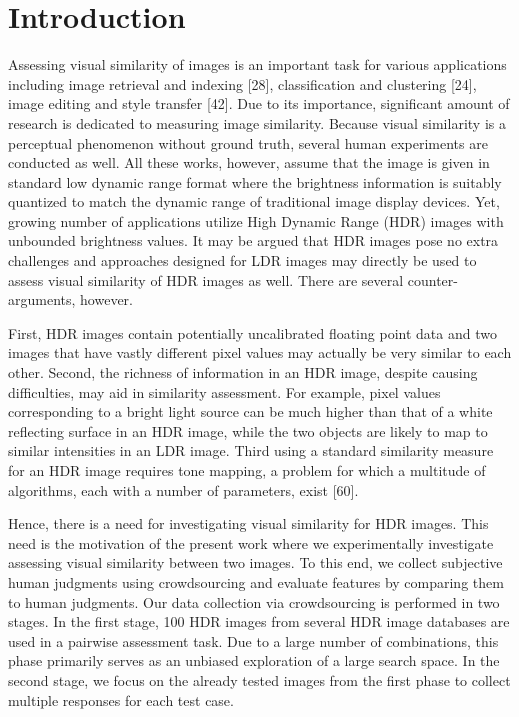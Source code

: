 \chapter{Introduction}
\label{chp:b1}

Assessing visual similarity of images is an important task for various applications including image retrieval and indexing [28], classification and clustering [24], image editing and style transfer [42]. Due to its importance, significant amount of research is dedicated to measuring image similarity. Because visual similarity is a perceptual phenomenon without ground truth, several human experiments are conducted as well. All these works, however, assume that the image is given in standard low dynamic range format where the brightness information is suitably quantized to match the dynamic range of traditional image display devices. Yet, growing number of applications utilize High Dynamic Range (HDR) images with unbounded brightness values. It may be argued that HDR images pose no extra challenges and approaches designed for LDR images may directly be used to assess visual similarity of HDR images as well. There are several counter-arguments, however.

First, HDR images contain potentially uncalibrated floating point data and two images that have vastly different pixel values may actually be very similar to each other. Second, the richness of information in an HDR image, despite causing difficulties, may aid in similarity assessment. For example, pixel values corresponding to
a bright light source can be much higher than that of a white reflecting surface in an HDR image, while the two objects are likely to map to similar intensities in an LDR image. Third using a standard similarity measure for an HDR image requires tone mapping, a problem for which a multitude of algorithms, each with a number of parameters, exist [60].

Hence, there is a need for investigating visual similarity for HDR images. This need is the motivation of the present work where we experimentally investigate assessing visual similarity between two images. To this end, we collect subjective human judgments using crowdsourcing and evaluate features by comparing them to human judgments. Our data collection via crowdsourcing is performed in two stages. In the first stage, 100 HDR images from several HDR image databases are used in a pairwise assessment task. Due to a large number of combinations, this phase primarily serves as an unbiased exploration of a large search space. In the second stage, we focus on the already tested images from the first phase to collect multiple responses for each test case.


